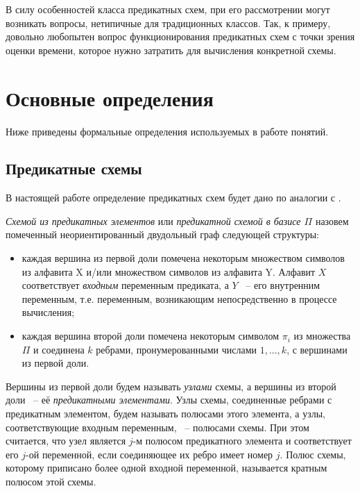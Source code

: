 \documentclass[12pt]{article}
\newenvironment{definition}[1][Определение]{\begin{trivlist}
\item[\hskip \labelsep {\bfseries #1}]}{\end{trivlist}}
\begin{document}
В силу особенностей класса предикатных схем, при его рассмотрении могут возникать вопросы,
нетипичные для традиционных классов. Так, к примеру, довольно любопытен вопрос функционирования предикатных схем с точки зрения оценки времени, которое нужно затратить для
вычисления конкретной схемы. 

\clearpage
\section{Основные определения}
Ниже приведены формальные определения используемых в работе понятий.

\subsection{Предикатные схемы}

В настоящей работе определение предикатных схем будет дано по аналогии с \cite{Shu11}.

\begin{definition}
\textit{Схемой из предикатных элементов} или \textit{предикатной схемой в базисе $\Pi$} назовем помеченный
неориентированный двудольный граф следующей структуры:

\begin{itemize}
\item каждая вершина из первой доли помечена некоторым множеством символов из алфавита X и/или 
множеством символов из алфавита Y. 
Алфавит $X$ соответствует \textit{входным} переменным предиката, а $Y$ ~-- его внутренним переменным, 
т.е. переменным, возникающим непосредственно в процессе вычисления; 

\item каждая вершина второй доли помечена некоторым символом $\pi_i$ из множества $\Pi$ и 
соединена $k$ ребрами, пронумерованными числами $1, ..., k$, с вершинами из первой доли.
\end{itemize}
\end{definition}

Вершины из первой доли будем называть \textit{узлами} схемы, а вершины из второй доли ~-- её \textit{предикатными элементами}. 
Узлы схемы, соединенные ребрами с предикатным элементом, будем называть полюсами этого элемента, 
а узлы, соответствующие входным переменным, ~-- полюсами схемы.
При этом считается, что узел является $j$-м полюсом предикатного элемента и соответствует 
его $j$-ой переменной, если соединяющее их ребро имеет номер $j$. Полюс схемы, которому приписано 
более одной входной переменной, называется кратным полюсом этой схемы. 
\end{document}
